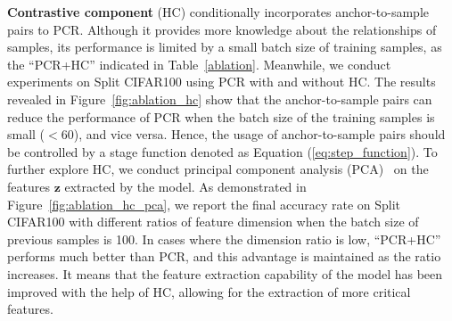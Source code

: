 \textbf{Contrastive component} (HC) conditionally incorporates anchor-to-sample pairs to PCR. Although it provides more knowledge about the relationships of samples, its performance is limited by a small batch size of training samples, as the ``PCR+HC'' indicated in Table~\ref{ablation}. Meanwhile, we conduct experiments on Split CIFAR100 using PCR with and without HC. The results revealed in Figure~\ref{fig:ablation_hc} show that the anchor-to-sample pairs can reduce the performance of PCR when the batch size of the training samples is small ($<60$), and vice versa. Hence, the usage of anchor-to-sample pairs should be controlled by a stage function denoted as Equation (\ref{eq:step_function}). To further explore HC, we conduct principal component analysis (PCA)~\cite{wold1987principal} on the features $\bm{z}$ extracted by the model. As demonstrated in Figure~\ref{fig:ablation_hc_pca}, we report the final accuracy rate on Split CIFAR100 with different ratios of feature dimension when the batch size of previous samples is 100. In cases where the dimension ratio is low, ``PCR+HC'' performs much better than PCR, and this advantage is maintained as the ratio increases. It means that the feature extraction capability of the model has been improved with the help of HC, allowing for the extraction of more critical features.


